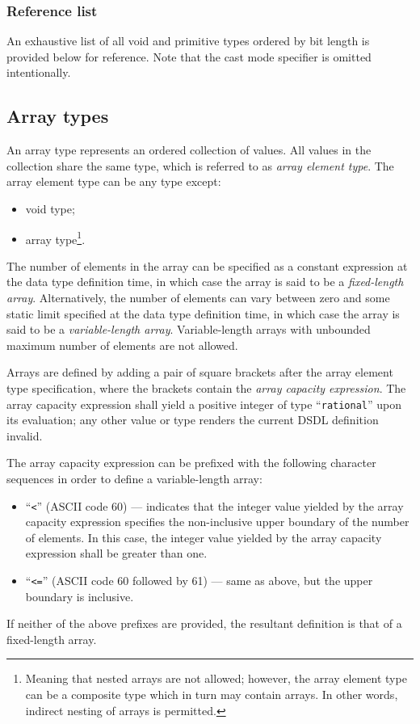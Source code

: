 \subsubsection{Reference list}

An exhaustive list of all void and primitive types
ordered by bit length is provided below for reference.
Note that the cast mode specifier is omitted intentionally.

\immediate{}
\immediate{}
\immediate

\subsection{Array types}

An array type represents an ordered collection of values.
All values in the collection share the same type, which is referred to as \emph{array element type}.
The array element type can be any type except:
\begin{itemize}
    \item void type;
    \item array type\footnote{Meaning that nested arrays are not allowed;
    however, the array element type can be a composite type which in turn may contain arrays.
    In other words, indirect nesting of arrays is permitted.}.
\end{itemize}

The number of elements in the array can be specified as a constant expression at the data type definition time,
in which case the array is said to be a \emph{fixed-length array}.
Alternatively, the number of elements can vary between zero and some static limit specified
at the data type definition time,
in which case the array is said to be a \emph{variable-length array}.
Variable-length arrays with unbounded maximum number of elements are not allowed.

Arrays are defined by adding a pair of square brackets after the array element type specification,
where the brackets contain the \emph{array capacity expression}.
The array capacity expression shall yield a positive integer of type ``\verb|rational|'' upon its evaluation;
any other value or type renders the current DSDL definition invalid.

The array capacity expression can be prefixed with the following character sequences in order to define
a variable-length array:
\begin{itemize}
    \item ``\verb|<|'' (ASCII code 60) --- indicates that the integer value yielded by the array capacity expression
    specifies the non-inclusive upper boundary of the number of elements.
    In this case, the integer value yielded by the array capacity expression shall be greater than one.

    \item ``\verb|<=|'' (ASCII code 60 followed by 61) --- same as above, but the upper boundary is inclusive.
\end{itemize}
If neither of the above prefixes are provided, the resultant definition is that of a fixed-length array.

